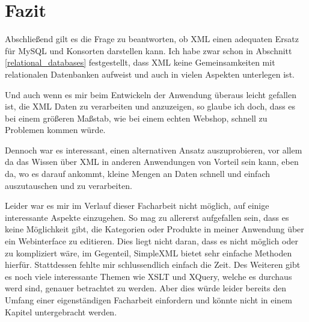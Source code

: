 \chapter{Fazit}
Abschließend gilt es die Frage zu beantworten, ob XML einen adequaten
Ersatz für MySQL und Konsorten darstellen kann. Ich habe zwar schon in
Abschnitt \ref{relational_databases} festgestellt, dass XML keine
Gemeinsamkeiten mit relationalen Datenbanken aufweist und auch in
vielen Aspekten unterlegen ist.

Und auch wenn es mir beim Entwickeln der Anwendung überaus leicht
gefallen ist, die XML Daten zu verarbeiten und anzuzeigen, so glaube
ich doch, dass es bei einem größeren Maßstab, wie bei einem echten
Webshop, schnell zu Problemen kommen würde.

Dennoch war es interessant, einen alternativen Ansatz auszuprobieren,
vor allem da das Wissen über XML in anderen Anwendungen von Vorteil
sein kann, eben da, wo es darauf ankommt, kleine Mengen an Daten
schnell und einfach auszutauschen und zu verarbeiten.

Leider war es mir im Verlauf dieser Facharbeit nicht möglich, auf
einige interessante Aspekte einzugehen. So mag zu allererst
aufgefallen sein, dass es keine Möglichkeit gibt, die Kategorien oder
Produkte in meiner Anwendung über ein Webinterface zu editieren. Dies
liegt nicht daran, dass es nicht möglich oder zu kompliziert wäre, im
Gegenteil, SimpleXML bietet sehr einfache Methoden hierfür.
Stattdessen fehlte mir schlussendlich einfach die Zeit. Des Weiteren
gibt es noch viele interessante Themen wie XSLT und XQuery, welche es
durchaus werd sind, genauer betrachtet zu werden. Aber dies würde
leider bereits den Umfang einer eigenständigen Facharbeit einfordern
und könnte nicht in einem Kapitel untergebracht werden.

